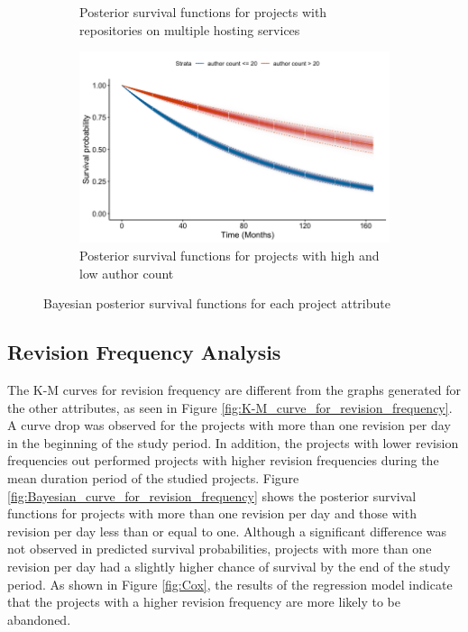 \documentclass[sigconf]{acmart}
\begin{document}
\begin{figure}
\begin{subfigure}[b]{\columnwidth}
        \caption{\small Posterior survival functions for projects with repositories on multiple hosting services}
        \label{fig:bayes_multi_repo}
    \end{subfigure}
    \hfill
    \begin{subfigure}[b]{\columnwidth}
        \centering 
        \includegraphics[width=\textwidth]{author_count_bayes.png} 
        \caption{\small Posterior survival functions for projects with high and low author count}
        \label{fig:bayes_author_count}
    \end{subfigure}
    \caption{\small Bayesian posterior survival functions for each project attribute} 
    \label{fig:Bayesian posterior survival functions}
\end{figure}

\subsection{Revision Frequency Analysis} \label{rev-freq-results}

The K-M curves for revision frequency are different from the graphs generated for the other attributes, as seen in Figure \ref{fig:K-M_curve_for_revision_frequency}. 
A curve drop was observed for the projects with more than one revision per day in the beginning of the study period.
In addition, the projects with lower revision frequencies out performed projects with higher revision frequencies during the mean duration period of the studied projects.
Figure \ref{fig:Bayesian_curve_for_revision_frequency} shows the posterior survival functions for projects with more than one revision per day and those with revision per day less than or equal to one. Although a significant difference was not observed in predicted survival probabilities, projects with more than one revision per day had a slightly higher chance of survival by the end of the study period.
As shown in Figure \ref{fig:Cox}, the results of the regression model indicate that the projects with a higher revision frequency are more likely to be abandoned.
\end{document}
